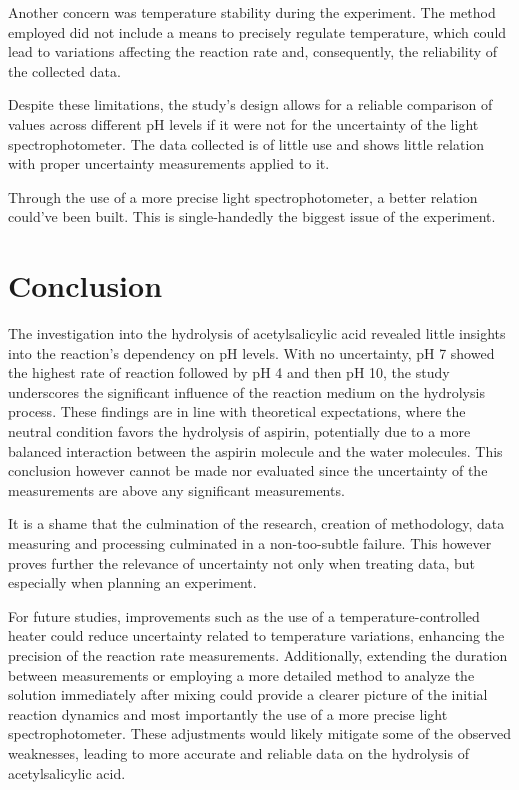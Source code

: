 \documentclass{article}
\begin{document}
Another concern was temperature stability during the experiment. The method employed did not include a means to precisely regulate temperature, which could lead to variations affecting the reaction rate and, consequently, the reliability of the collected data.

Despite these limitations, the study's design allows for a reliable comparison of values across different pH levels if it were not for the uncertainty of the light spectrophotometer. The data collected is of little use and shows little relation with proper uncertainty measurements applied to it.

Through the use of a more precise light spectrophotometer, a better relation could've been built. This is single-handedly the biggest issue of the experiment.

\section{Conclusion}
The investigation into the hydrolysis of acetylsalicylic acid revealed little insights into the reaction's dependency on pH levels. With no uncertainty, pH 7 showed the highest rate of reaction followed by pH 4 and then pH 10, the study underscores the significant influence of the reaction medium on the hydrolysis process. These findings are in line with theoretical expectations, where the neutral condition favors the hydrolysis of aspirin, potentially due to a more balanced interaction between the aspirin molecule and the water molecules. This conclusion however cannot be made nor evaluated since the uncertainty of the measurements are above any significant measurements.

It is a shame that the culmination of the research, creation of methodology, data measuring and processing culminated in a non-too-subtle failure. This however proves further the relevance of uncertainty not only when treating data, but especially when planning an experiment.

For future studies, improvements such as the use of a temperature-controlled heater could reduce uncertainty related to temperature variations, enhancing the precision of the reaction rate measurements. Additionally, extending the duration between measurements or employing a more detailed method to analyze the solution immediately after mixing could provide a clearer picture of the initial reaction dynamics and most importantly the use of a more precise light spectrophotometer. These adjustments would likely mitigate some of the observed weaknesses, leading to more accurate and reliable data on the hydrolysis of acetylsalicylic acid.

\pagebreak


\end{document}
